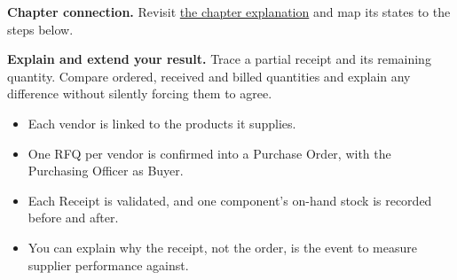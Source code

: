 \textbf{Chapter connection.} Revisit \hyperref[ch:scm]{the chapter explanation} and map its states to the steps below.




\begin{verification}
\textbf{Explain and extend your result.} Trace a partial receipt and its remaining quantity. Compare ordered, received and billed quantities and explain any difference without silently forcing them to agree.


\begin{itemize}
  \item Each vendor is linked to the products it supplies.
  \item One RFQ per vendor is confirmed into a Purchase Order, with the Purchasing Officer as Buyer.
  \item Each Receipt is validated, and one component's on-hand stock is recorded before and after.
  \item You can explain why the receipt, not the order, is the event to measure supplier performance against.
\end{itemize}
\end{verification}
